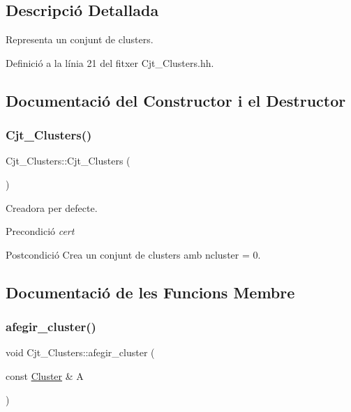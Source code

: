 \subsection{Descripció Detallada}
Representa un conjunt de clusters. 

Definició a la línia 21 del fitxer Cjt\+\_\+\+Clusters.\+hh.



\subsection{Documentació del Constructor i el Destructor}
\mbox{\label{class_cjt___clusters_a2e55759944a78043744103e19dd87c1c}} 
\subsubsection{\texorpdfstring{Cjt\+\_\+\+Clusters()}{Cjt\_Clusters()}}
{\footnotesize\ttfamily Cjt\+\_\+\+Clusters\+::\+Cjt\+\_\+\+Clusters (\begin{DoxyParamCaption}{ }\end{DoxyParamCaption})}



Creadora per defecte. 

\begin{DoxyPrecond}{Precondició}
{\itshape cert} 
\end{DoxyPrecond}
\begin{DoxyPostcond}{Postcondició}
Crea un conjunt de clusters amb ncluster = 0. 
\end{DoxyPostcond}


\subsection{Documentació de les Funcions Membre}
\mbox{\label{class_cjt___clusters_a0f77012c09e43a3be17043ddf4ac061c}} 
\subsubsection{\texorpdfstring{afegir\+\_\+cluster()}{afegir\_cluster()}}
{\footnotesize\ttfamily void Cjt\+\_\+\+Clusters\+::afegir\+\_\+cluster (\begin{DoxyParamCaption}\item[{const \hyperlink{class_cluster}{Cluster} \&}]{A }\end{DoxyParamCaption})}



